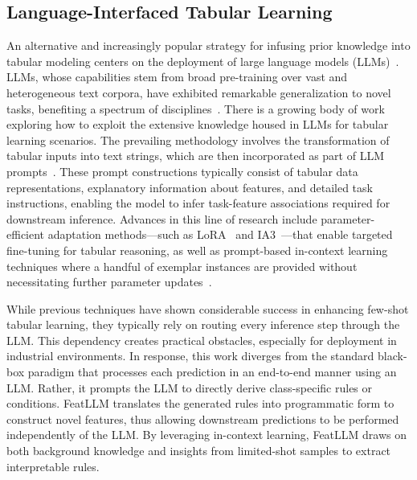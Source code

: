 \subsection{Language-Interfaced Tabular Learning} An alternative and increasingly popular strategy for infusing prior knowledge into tabular modeling centers on the deployment of large language models (LLMs)~\cite{anil2023palm,openai2023gpt4}. LLMs, whose capabilities stem from broad pre-training over vast and heterogeneous text corpora, have exhibited remarkable generalization to novel tasks, benefiting a spectrum of disciplines~\cite{brown2020language}. There is a growing body of work exploring how to exploit the extensive knowledge housed in LLMs for tabular learning scenarios. The prevailing methodology involves the transformation of tabular inputs into text strings, which are then incorporated as part of LLM prompts~\cite{dinh2022lift,hegselmann2023tabllm,wang2023anypredict}. These prompt constructions typically consist of tabular data representations, explanatory information about features, and detailed task instructions, enabling the model to infer task-feature associations required for downstream inference. Advances in this line of research include parameter-efficient adaptation methods—such as LoRA~\cite{hu2021lora} and IA3~\cite{liu2022few}—that enable targeted fine-tuning for tabular reasoning, as well as prompt-based in-context learning techniques where a handful of exemplar instances are provided without necessitating further parameter updates~\cite{dinh2022lift,hegselmann2023tabllm,nam2023semi,slack2023tablet}.

While previous techniques have shown considerable success in enhancing few-shot tabular learning, they typically rely on routing every inference step through the LLM. This dependency creates practical obstacles, especially for deployment in industrial environments. In response, this work diverges from the standard black-box paradigm that processes each prediction in an end-to-end manner using an LLM. Rather, it prompts the LLM to directly derive class-specific rules or conditions. \textsf{FeatLLM} translates the generated rules into programmatic form to construct novel features, thus allowing downstream predictions to be performed independently of the LLM. By leveraging in-context learning, \textsf{FeatLLM} draws on both background knowledge and insights from limited-shot samples to extract interpretable rules.

